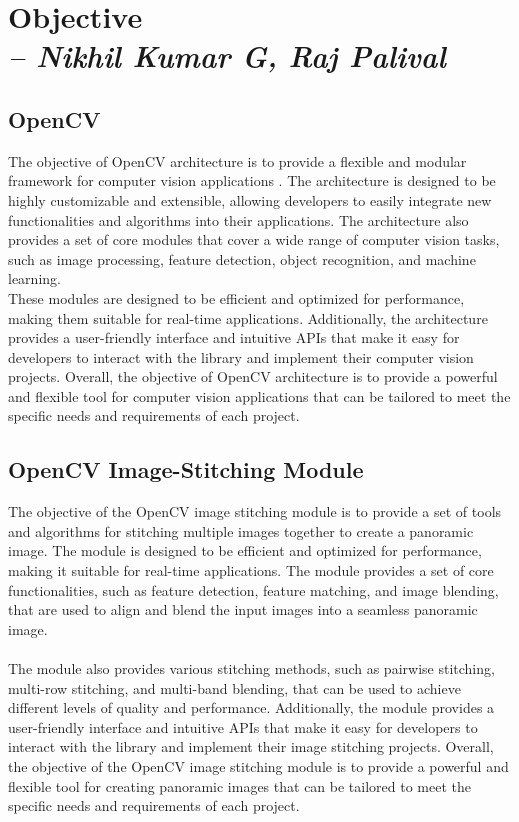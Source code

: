 \chapter{Objective\\
\small{\textit{-- Nikhil Kumar G, Raj Palival}}
\label{Chapter::Objective}}

\section{OpenCV\label{openCVObjective}}
The objective of OpenCV architecture is to provide a flexible and modular framework for computer vision applications \cite{sampleArch}. The architecture is designed to be highly customizable and extensible, allowing developers to easily integrate new functionalities and algorithms into their applications. The architecture also provides a set of core modules that cover a wide range of computer vision tasks, such as image processing, feature detection, object recognition, and machine learning.\\These modules are designed to be efficient and optimized for performance, making them suitable for real-time applications. Additionally, the architecture provides a user-friendly interface and intuitive APIs that make it easy for developers to interact with the library and implement their computer vision projects. Overall, the objective of OpenCV architecture is to provide a powerful and flexible tool for computer vision applications that can be tailored to meet the specific needs and requirements of each project. 
 
\section{OpenCV Image-Stitching Module\label{imageStitchObjective}}
The objective of the OpenCV image stitching module is to provide a set of tools and algorithms for stitching multiple images together to create a panoramic image. The module is designed to be efficient and optimized for performance, making it suitable for real-time applications. The module provides a set of core functionalities, such as feature detection, feature matching, and image blending, that are used to align and blend the input images into a seamless panoramic image.\\
\\The module also provides various stitching methods, such as pairwise stitching, multi-row stitching, and multi-band blending, that can be used to achieve different levels of quality and performance. Additionally, the module provides a user-friendly interface and intuitive APIs that make it easy for developers to interact with the library and implement their image stitching projects. Overall, the objective of the OpenCV image stitching module is to provide a powerful and flexible tool for creating panoramic images that can be tailored to meet the specific needs and requirements of each project.